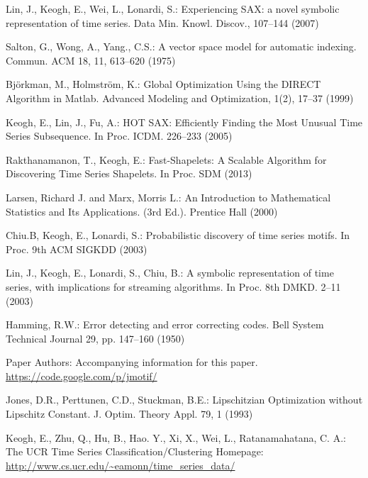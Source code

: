\documentclass{llncs}
\begin{document}
\begin{thebibliography}{5}
Lin, J., Keogh, E., Wei, L., Lonardi, S.:
Experiencing SAX: a novel symbolic representation of time series.
Data Min. Knowl. Discov., 107--144 (2007)

Salton, G., Wong, A., Yang., C.S.:
A vector space model for automatic indexing. 
Commun. ACM 18, 11, 613--620 (1975)

Björkman, M., Holmström, K.:
Global Optimization Using the DIRECT Algorithm in Matlab.
Advanced Modeling and Optimization, 1(2), 17--37 (1999)

Keogh, E., Lin, J., Fu, A.:
HOT SAX: Efficiently Finding the Most Unusual Time Series Subsequence. 
In Proc. ICDM. 226--233 (2005)

Rakthanamanon, T., Keogh, E.:
Fast-Shapelets: A Scalable Algorithm for Discovering Time Series Shapelets.
In Proc. SDM (2013)

Larsen, Richard J. and Marx, Morris L.:
An Introduction to Mathematical Statistics and Its Applications. (3rd Ed.).
Prentice Hall (2000)


Chiu.B, Keogh, E., Lonardi, S.:
Probabilistic discovery of time series motifs. 
In Proc. 9th ACM SIGKDD (2003)

Lin, J., Keogh, E., Lonardi, S., Chiu, B.:
A symbolic representation of time series, with implications for streaming algorithms. 
In Proc. 8th DMKD. 2--11 (2003)

Hamming, R.W.:
Error detecting and error correcting codes. 
Bell System Technical Journal 29, pp. 147--160 (1950)

Paper Authors:
Accompanying information for this paper. 
\url{https://code.google.com/p/jmotif/}

Jones, D.R., Perttunen, C.D., Stuckman, B.E.:
Lipschitzian Optimization without Lipschitz Constant.
J. Optim. Theory Appl. 79, 1 (1993)

Keogh, E., Zhu, Q., Hu, B., Hao. Y.,  Xi, X., Wei, L., Ratanamahatana, C. A.:
The UCR Time Series Classification/Clustering Homepage:
\url{http://www.cs.ucr.edu/~eamonn/time_series_data/}


\end{thebibliography}
\end{document}
